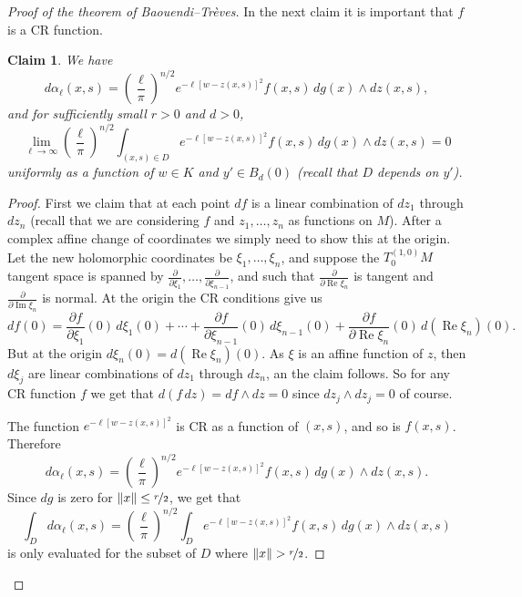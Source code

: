 \documentclass[12pt,openany]{book}
\renewcommand{\Re}{\operatorname{Re}}
\renewcommand{\Im}{\operatorname{Im}}
\newcommand{\snorm}[1]{\lVert {#1} \rVert}
\theoremstyle{plain}
\newtheorem{claim}[thm]{Claim}
\theoremstyle{remark}
\theoremstyle{definition}
\theoremstyle{exercise}
\theoremstyle{example}
\begin{document}
\begin{proof}[Proof of the theorem of Baouendi--Tr{\`e}ves]
In the next claim it is important that $f$ is a CR function.

\begin{claim}
We have
\begin{equation*}
d \alpha_\ell(x,s)
=
{\left(\frac{\ell}{\pi}\right)}^{n/2}
e^{-\ell [w - z(x,s)]^2} f(x,s)
\,
dg(x) 
\wedge
dz(x,s) ,
\end{equation*}
and for sufficiently small $r>0$ and $d>0$,
\begin{equation*}
\lim_{\ell\to\infty}
{\left(\frac{\ell}{\pi}\right)}^{n/2}
\int_{(x,s)\in D}
e^{-\ell [w - z(x,s)]^2} f(x,s)
\,
dg(x) 
\wedge
dz(x,s)
= 0
\end{equation*}
uniformly as a function of $w \in K$ and $y' \in B_d(0)$ (recall that $D$ depends on
$y'$).
\end{claim}

\begin{proof}
First we claim that at each point $df$ is a linear combination of $dz_1$
through $dz_n$ (recall that we are considering $f$ and $z_1,\ldots,z_n$ as
functions on $M$).  After a complex affine change of coordinates we simply
need to show this at the origin.  Let the new holomorphic coordinates be
$\xi_1,\ldots,\xi_n$, and suppose the $T^{(1,0)}_0 M$ tangent space is spanned
by $\frac{\partial}{\partial \xi_1},\ldots,\frac{\partial}{\partial
\xi_{n-1}}$, and such that $\frac{\partial}{\partial \Re \xi_n}$ is tangent
and $\frac{\partial}{\partial \Im \xi_n}$ is normal.  At the origin the CR conditions give us
\begin{equation*}
df(0) =
\frac{\partial f}{\partial \xi_1}(0) \, d\xi_1(0) + \cdots +
\frac{\partial f}{\partial \xi_{n-1}}(0) \, d\xi_{n-1}(0)  +
\frac{\partial f}{\partial \Re \xi_{n}}(0) \, d(\Re \xi_{n})(0) 
.
\end{equation*}
But at the origin $d\xi_n(0) = d(\Re \xi_n)(0)$.
As $\xi$ is an affine function of $z$, then $d\xi_j$ are linear
combinations of $dz_1$ through $dz_n$, an the claim follows.
So for any CR function
$f$ we get that $d(f\,dz) = df \wedge dz = 0$ since $dz_j \wedge dz_j = 0$ of course.

The function
$e^{-\ell [w - z(x,s)]^2}$ is CR as a function of $(x,s)$, and so
is $f(x,s)$.  Therefore
\begin{equation*}
d \alpha_{\ell}(x,s)
=
{\left(\frac{\ell}{\pi}\right)}^{n/2}
e^{-\ell [w - z(x,s)]^2 } f(x,s)
\,
dg(x) 
\wedge
dz(x,s) .
\end{equation*}
Since $dg$ is zero for $\snorm{x} \leq \nicefrac{r}{2}$, we get that
\begin{equation*}
\int_D
d \alpha_\ell(x,s)
=
{\left(\frac{\ell}{\pi}\right)}^{n/2}
\int_D
e^{ -\ell [w - z(x,s)]^2} f(x,s)
\,
dg(x) 
\wedge
dz(x,s)
\end{equation*}
is only evaluated for the subset of $D$ where $\snorm{x} > \nicefrac{r}{2}$.


\end{proof}
\end{proof}
\end{document}

